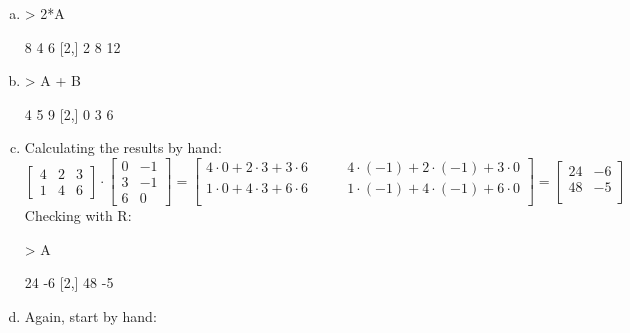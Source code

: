 \documentclass[a4paper,12pt]{scrartcl}
\begin{document}
\begin{enumerate}[a)]
\item 
\begin{Schunk}
\begin{Sinput}
> 2*A
\end{Sinput}
\begin{Soutput}
     [,1] [,2] [,3]
[1,]    8    4    6
[2,]    2    8   12
\end{Soutput}
\end{Schunk}
\item 
\begin{Schunk}
\begin{Sinput}
> A + B
\end{Sinput}
\begin{Soutput}
     [,1] [,2] [,3]
[1,]    4    5    9
[2,]    0    3    6
\end{Soutput}
\end{Schunk}
\item Calculating the results by hand: 
\begin{equation*}
\left[\begin{array}{ccc} 4 & 2 & 3 \\ 1 &4 & 6 \end{array}\right] \cdot \begin{bmatrix} 0 & -1 \\ 3 & -1 \\ 6 & 0\end{bmatrix}
= \begin{bmatrix}
4\cdot 0 + 2\cdot 3 + 3\cdot 6 \quad & \quad 4\cdot (-1) + 2\cdot (-1) + 3\cdot 0 \\
1\cdot 0 + 4\cdot 3 + 6\cdot 6 \quad & \quad 1\cdot (-1) + 4\cdot (-1) + 6\cdot 0 \\
\end{bmatrix} =  \begin{bmatrix}
24 &  -6 \\
48 & -5\\
\end{bmatrix} 
\end{equation*}
Checking with R:
\begin{Schunk}
\begin{Sinput}
> A%*%t(B)
\end{Sinput}
\begin{Soutput}
     [,1] [,2]
[1,]   24   -6
[2,]   48   -5
\end{Soutput}
\end{Schunk}
\item Again, start by hand:


\end{enumerate}
\end{document}
